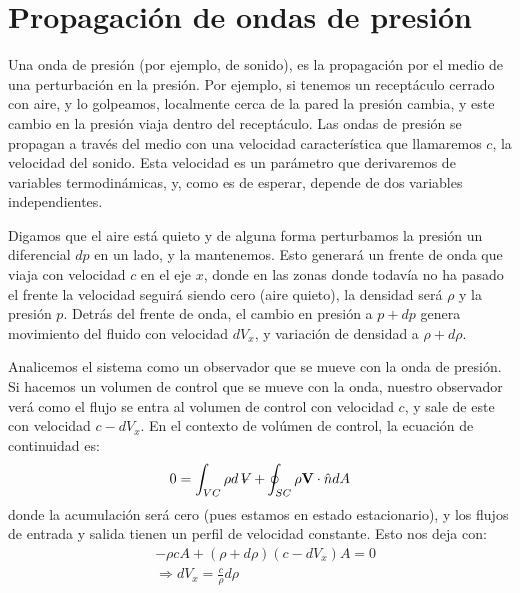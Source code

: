 \section*{Propagación de ondas de presión}

Una onda de presión (por ejemplo, de sonido), es la propagación por el medio de una perturbación en la presión.
Por ejemplo, si tenemos un receptáculo cerrado con aire, y lo golpeamos, localmente cerca de la pared la presión cambia, y este cambio en la presión viaja dentro del receptáculo.
Las ondas de presión se propagan a través del medio con una velocidad característica que llamaremos $c$, la velocidad del sonido.
Esta velocidad es un parámetro que derivaremos de variables termodinámicas, y, como es de esperar, depende de dos variables independientes.

Digamos que el aire está quieto y de alguna forma perturbamos la presión un diferencial $dp$ en un lado, y la mantenemos.
Esto generará un frente de onda que viaja con velocidad $c$ en el eje $x$, donde en las zonas donde todavía no ha pasado el frente la velocidad seguirá siendo cero (aire quieto), la densidad será $\rho$ y la presión $p$.
Detrás del frente de onda, el cambio en presión a $p+dp$ genera movimiento del fluido con velocidad $dV_x$, y variación de densidad a $\rho+d\rho$.

Analicemos el sistema como un observador que se mueve con la onda de presión.
Si hacemos un volumen de control que se mueve con la onda, nuestro observador verá como el flujo se entra al volumen de control con velocidad $c$, y sale de este con velocidad $c-dV_x$.
En el contexto de volúmen de control, la ecuación de continuidad es:
%
\begin{equation}
0 = \int_{VC}\rho d\vol + \oint_{SC}\rho \mathbf{V}\cdot\hat{n}dA
\end{equation}
%
donde la acumulación será cero (pues estamos en estado estacionario), y los flujos de entrada y salida tienen un perfil de velocidad constante.
Esto nos deja con:
%
\begin{align}\label{eq:continuidad_onda}
&-\rho c A + (\rho+d\rho)(c-dV_x)A = 0\nonumber\\
&\Rightarrow dV_x = \frac{c}{\rho}d\rho
\end{align}

